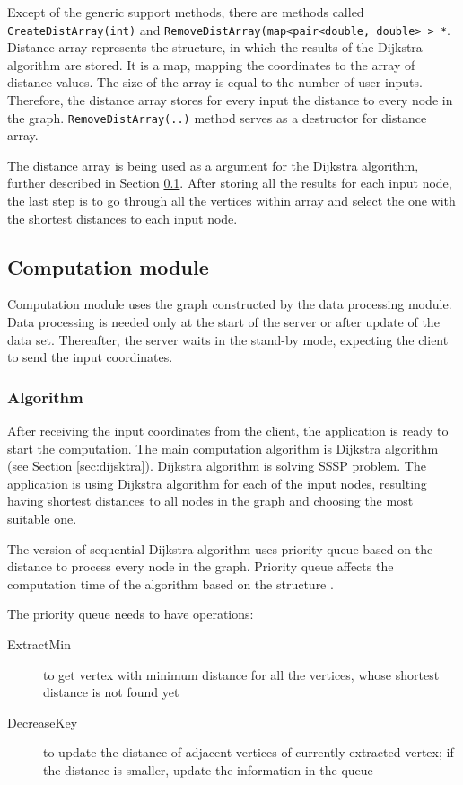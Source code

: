 \documentclass[thesis=M,english]{FITthesis}[2012/10/20]
\begin{document}
Except of the generic support methods, there are methods called \texttt{CreateDistArray(int)} and \texttt{RemoveDistArray(map<pair<double, double> > *}. Distance array represents the structure, in which the results of the Dijkstra algorithm are stored. It is a map, mapping the coordinates to the array of distance values. The size of the array is equal to the number of user inputs. Therefore, the distance array stores for every input the distance to every node in the graph. 
\texttt{RemoveDistArray(..)} method serves as a destructor for distance array.

The distance array is being used as a argument for the Dijkstra algorithm, further described in Section \ref{subsec:server_comp}. After storing all the results for each input node, the last step is to go through all the vertices within array and select the one with the shortest distances to each input node.


\subsection{Computation module}
\label{subsec:server_comp}
Computation module uses the graph constructed by the data processing module. Data processing is needed only at the start of the server or after update of the data set. Thereafter, the server waits in the stand-by mode, expecting the client to send the input coordinates. 

\subsubsection{Algorithm}
After receiving the input coordinates from the client, the application is ready to start the computation. 
The main computation algorithm is Dijkstra algorithm (see Section \ref{sec:dijsktra}). Dijkstra algorithm is solving SSSP problem. The application is using Dijkstra algorithm for each of the input nodes, resulting having shortest distances to all nodes in the graph and choosing the most suitable one.

The version of sequential Dijkstra algorithm uses priority queue based on the distance to process every node in the graph. Priority queue affects the computation time of the algorithm based on the structure \cite{Chen07}. 

The priority queue needs to have operations:
\begin{description}

\item[ExtractMin] to get vertex with minimum distance for all the vertices, whose shortest distance is not found yet
\item[DecreaseKey] to update the distance of adjacent vertices of currently	extracted vertex; if the distance is smaller, update the information in the queue

\end{description}
\end{document}
